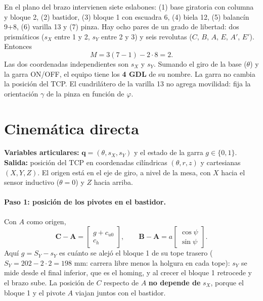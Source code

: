 \documentclass[a4paper,12pt]{article}
\begin{document}
En el plano del brazo intervienen siete eslabones: (1) base giratoria con columna y bloque 2, (2) bastidor,
(3) bloque 1 con escuadra 6, (4) biela 12, (5) balancín 9+8, (6) varilla 13 y (7) pinza. Hay ocho pares de
un grado de libertad: dos prismáticos ($s_X$ entre 1 y 2, $s_Y$ entre 2 y 3) y seis revolutas ($C$, $B$,
$A$, $E$, $A'$, $E'$). Entonces
\begin{equation}
M = 3(7-1) - 2\cdot 8 = 2 .
\end{equation}
Las dos coordenadas independientes son $s_X$ y $s_Y$. Sumando el giro de la base ($\theta$) y la garra
ON/OFF, el equipo tiene los \textbf{4 GDL} de su nombre. La garra no cambia la posición del TCP. El
cuadrilátero de la varilla 13 no agrega movilidad: fija la orientación $\gamma$ de la pinza en función de $\varphi$.

\section{Cinemática directa}

\textbf{Variables articulares:} $\mathbf{q} = (\theta, s_X, s_Y)$ y el estado de la garra $g \in \{0,1\}$.
\textbf{Salida:} posición del TCP en coordenadas cilíndricas $(\theta, r, z)$ y cartesianas $(X, Y, Z)$.
El origen está en el eje de giro, a nivel de la mesa, con $X$ hacia el sensor inductivo ($\theta = 0$) y
$Z$ hacia arriba.

\paragraph{Paso 1: posición de los pivotes en el bastidor.} Con $A$ como origen,
\begin{equation}
\mathbf{C}-\mathbf{A} = \begin{bmatrix} g + c_{u0}\\ c_h\end{bmatrix},\qquad
\mathbf{B}-\mathbf{A} = a\begin{bmatrix}\cos\psi\\ \sin\psi\end{bmatrix}.
\end{equation}
Aquí $g = S_Y - s_Y$ es cuánto se alejó el bloque 1 de su tope trasero ($S_Y = 202 - 2\cdot2 = 198$ mm: carrera libre menos la holgura en cada tope): $s_Y$ se mide desde
el final inferior, que es el homing, y al crecer el bloque 1 retrocede y el brazo sube. La posición de $C$
respecto de $A$ \textbf{no depende de} $s_X$, porque el bloque 1 y el pivote $A$ viajan
juntos con el bastidor.
\end{document}
